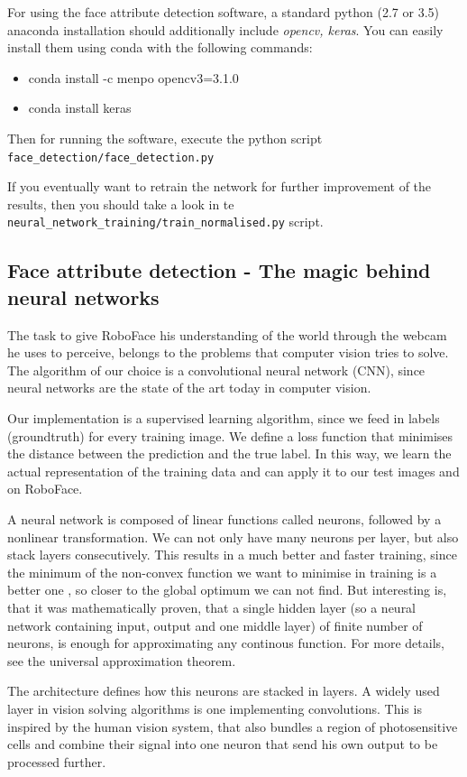 \documentclass[12.5pt]{scrartcl}
\begin{document}
	
	For using the face attribute detection software, a standard python (2.7 or 3.5) anaconda installation should additionally include \textit{opencv, keras}. You can easily install them using conda with the following commands:
	\begin{itemize}
	\item conda install -c menpo opencv3=3.1.0
	\item conda install keras
	\end{itemize}
	Then for running the software, execute the python script \texttt{face\_detection/face\_detection.py}
	
	If you eventually want to retrain the network for further improvement of the results, then you should take a look in te \texttt{neural\_network\_training/train\_normalised.py} script.
	\subsection{Face attribute detection - The magic behind neural networks}
	The task to give RoboFace his understanding of the world through the webcam he uses to perceive, belongs to the problems that computer vision tries to solve. The algorithm of our choice is a convolutional neural network (CNN), since neural networks are the state of the art today in computer vision.
	
	Our implementation is a supervised learning algorithm, since we feed in labels (groundtruth) for every training image. We define a loss function that minimises the distance between the prediction and the true label. In this way, we learn the actual representation of the training data and can apply it to our test images and on RoboFace.
	
	A neural network is composed of linear functions called neurons, followed by a nonlinear transformation. We can not only have many neurons per layer, but also stack layers consecutively. This results in a much better and faster training, since the minimum of the non-convex function we want to minimise in training is a better one , so closer to the global optimum we can not find. But interesting is, that it was mathematically proven, that a single hidden layer (so a neural network containing input, output and one middle layer) of finite number of neurons, is enough for approximating any continous function. For more details, see the universal approximation theorem.
	
	
	The architecture defines how this neurons are stacked in layers. A widely used layer in vision solving algorithms is one implementing convolutions. This is inspired by the human vision system, that also bundles a region of photosensitive cells and combine their signal into one neuron that send his own output to be processed further.
	
\end{document}
